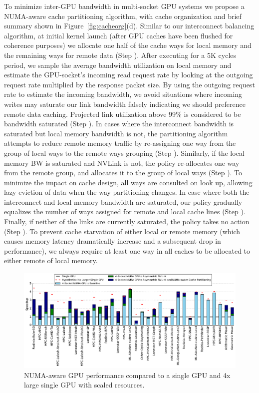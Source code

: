 To minimize inter-GPU bandwidth in multi-socket GPU systems we propose a
NUMA-aware cache partitioning algorithm, with cache organization and brief summary 
shown in Figure~\ref{fig:cacheorg}(d).  Similar to our interconnect balancing
algorithm, at initial kernel launch (after GPU caches have been flushed for
coherence purposes) we allocate one half of the cache ways for local memory and 
the remaining ways for remote data (Step ). After executing for a 5K cycles 
period, we sample the average bandwidth utilization on local memory and estimate
the GPU-socket's incoming read request rate by looking at the outgoing request rate
multiplied by the response packet size.  By using the outgoing request rate to estimate
the incoming bandwidth, we avoid situations where incoming writes may saturate
our link bandwidth falsely indicating we should preference remote data caching.
Projected link utilization above 99\% is considered to be bandwidth saturated 
(Step ). In cases where the interconnect bandwidth is saturated but
local memory bandwidth is not, the partitioning algorithm attempts to reduce remote 
memory traffic by re-assigning one way from the group of local ways to the
remote ways grouping (Step ).
Similarly, if the local memory BW is saturated and NVLink is not, the policy 
re-allocates one way from the remote group, and allocates it to the group of local ways (Step 
).  To minimize the impact on cache design, all ways are consulted on look
up, allowing lazy eviction of data when the way partitioning changes.
In case where both the interconnect and local memory bandwidth 
are saturated, our policy gradually equalizes the number of ways assigned for remote 
and local cache lines (Step ). Finally, if neither of the links are 
currently saturated, the policy takes no action (Step ).  To prevent
cache starvation of either local or remote memory (which causes memory latency
dramatically increase and a subsequent drop in performance), we always require at 
least one way in all caches to be allocated to either remote of local memory.

\begin{figure}[tp]
    \centering
    \includegraphics[width=1.0\textwidth]{figures/plot_final_speedup_WB_nvlink_first.pdf}
    \caption{NUMA-aware GPU performance compared to a single GPU and 4x large single GPU with scaled resources.}
    \label{fig:combined}
    \vspace{-.2in}
\end{figure}

